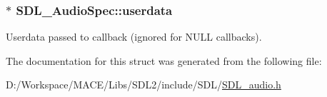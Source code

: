 \subsubsection[{\texorpdfstring{userdata}{userdata}}]{$\ast$ S\+D\+L\+\_\+\+Audio\+Spec\+::userdata}\hypertarget{struct_s_d_l___audio_spec_aeec9481666f5f0982c98d3878f175d9b}{}\label{struct_s_d_l___audio_spec_aeec9481666f5f0982c98d3878f175d9b}
Userdata passed to callback (ignored for N\+U\+LL callbacks). 

The documentation for this struct was generated from the following file\+:\begin{DoxyCompactItemize}
\item 
D\+:/\+Workspace/\+M\+A\+C\+E/\+Libs/\+S\+D\+L2/include/\+S\+D\+L/\hyperlink{_s_d_l__audio_8h}{S\+D\+L\+\_\+audio.\+h}\end{DoxyCompactItemize}
